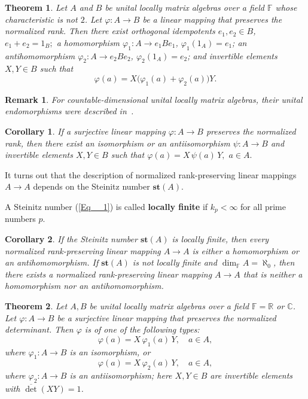 \documentclass[12pt]{amsart}
\newtheorem{theorem}{Theorem}
\newtheorem{remark}{Remark}
\newtheorem{corollary}{Corollary}
\begin{document}
{		 \begin{theorem}\label{Th__1} 
			Let $A$ and $ B$ be unital locally matrix algebras over a field $\mathbb{F}$ whose characteristic is not $2$.  
			Let $\varphi : A \to B$ be a linear mapping that preserves the normalized rank.  
			Then there exist orthogonal idempotents $e_1, e_2 \in B$, $e_1 + e_2 = 1_B;$  
			a homomorphism $\varphi_1 : A \to e_1 B e_1$, $\varphi_1(1_A) = e_1$;  
			an antihomomorphism $\varphi_2 : A \to e_2 B e_2$, $\varphi_2(1_A) = e_2$;  
			and invertible elements $X, Y \in B$ such that
			\[	\varphi(a) = X \bigl( \varphi_1(a) + \varphi_2(a) \bigr) Y.
			\]  \end{theorem}
			
 \begin{remark}  
			For countable-dimensional unital locally matrix algebras, their unital endomorphisms were described in~\cite{14}. \end{remark}
			
 \begin{corollary} \label{Cor__1} 
			If a surjective linear mapping $\varphi : A \to B$ preserves the normalized rank,  
			then there exist an isomorphism or an antiisomorphism $	\psi : A \to B$			and invertible elements $X, Y \in B$ such that 	$\varphi(a) = X \, \psi(a) \, Y, $ $ a \in A.$ \end{corollary}
		
		It turns out that the description of normalized rank-preserving linear mappings 
		$A \to A$ depends on the Steinitz number   $\mathbf{st}(A)$.  
		
A Steinitz number   (\ref{Eq__1})  is called \textbf{locally finite} if $k_p < \infty$ for all prime numbers $p$.
		
	 \begin{corollary} \label{Cor__2} 
		If the Steinitz number $\mathbf{st}(A)$ is locally finite, 
		then every normalized rank-preserving linear mapping $ A \to A$ 
		is either a homomorphism or an antihomomorphism.  
		If $\mathbf{st}(A)$ is not locally finite and $\dim_{\mathbb{F}} A = \aleph_0$, 
		then there exists a normalized rank-preserving linear mapping $ A \to A$ 
		that is neither a homomorphism nor an antihomomorphism. \end{corollary}
		
	
		

		
	
		
	\begin{theorem}\label{Th__2}
		Let $A, B$ be unital locally matrix algebras over a field 
		$\mathbb{F} = \mathbb{R}$ or $\mathbb{C}$.  
		Let $\varphi \colon A \to B$ be a surjective linear mapping that preserves 
		the normalized determinant.  
		Then $\varphi$ is of one of the following types:
		\[
		\varphi(a) = X \, \varphi_1(a) \, Y, \quad a \in A,
		\]
		where $\varphi_1 \colon A \to B$ is an isomorphism, or
		\[
		\varphi(a) = X \, \varphi_2(a) \, Y, \quad a \in A,
		\]
		where $\varphi_2 \colon A \to B$ is an anti\-isomorphism;  
		here $X, Y \in B$ are invertible elements with $\overline{\det}(X Y) = 1$. 	\end{theorem}
		
}
\end{document}
